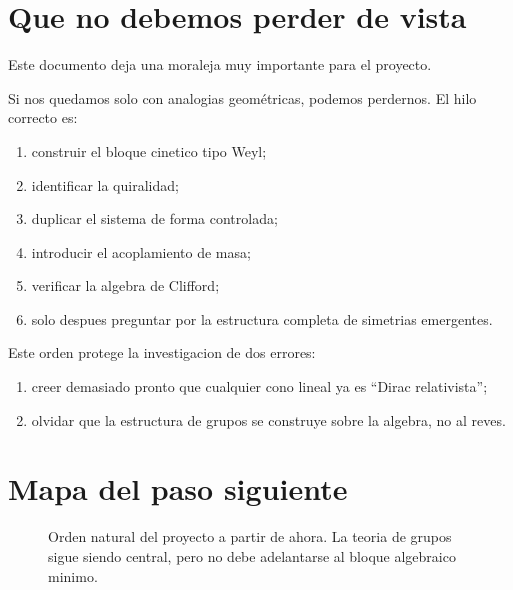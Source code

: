 \section{Que no debemos perder de vista}

Este documento deja una moraleja muy importante para el proyecto.

Si nos quedamos solo con analogias geométricas, podemos perdernos. El hilo correcto es:

\begin{enumerate}[leftmargin=*]
  \item construir el bloque cinetico tipo Weyl;
  \item identificar la quiralidad;
  \item duplicar el sistema de forma controlada;
  \item introducir el acoplamiento de masa;
  \item verificar la algebra de Clifford;
  \item solo despues preguntar por la estructura completa de simetrias emergentes.
\end{enumerate}

Este orden protege la investigacion de dos errores:

\begin{enumerate}[leftmargin=*]
  \item creer demasiado pronto que cualquier cono lineal ya es \enquote{Dirac relativista};
  \item olvidar que la estructura de grupos se construye sobre la algebra, no al reves.
\end{enumerate}

\section{Mapa del paso siguiente}

\begin{figure}[ht]
\centering
{}
\caption{Orden natural del proyecto a partir de ahora. La teoria de grupos sigue siendo central, pero no debe adelantarse al bloque algebraico minimo.}
\label{c07:fig:next-step}
\end{figure}

